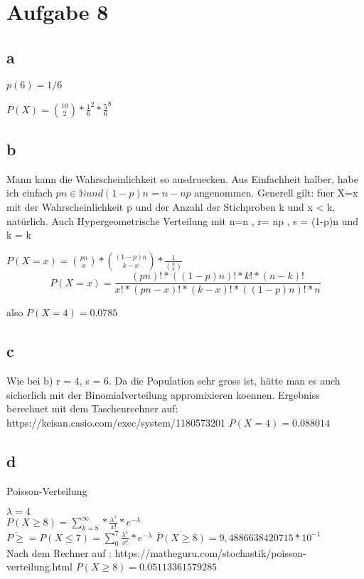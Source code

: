 \documentclass[]{article}
\title{}
\author{}
\begin{document}
\maketitle

\section{Aufgabe 8}
\subsection{a}
$ p(6) = 1/6$

$P(X) = \binom{10}2 * \frac{1}{6}^2 * \frac{5}{6}^8 $
\subsection{b}
Mann kann die Wahrscheinlichkeit so ausdruecken. Aus Einfachheit halber, habe ich einfach $ pn \in \mathbb{N} und (1-p)n = n-np $ angenommen.
Generell gilt: fuer X=x   mit der Wahrscheinlichkeit p und der Anzahl der Stichproben k und x < k, nat\"urlich.
Auch Hypergeometrische Verteilung mit n=n , r= np , s = (1-p)n und k = k

$P(X=x) = \binom{pn}{x} * \binom{(1-p)n}{k-x}  * \frac{1}{\binom{n}{k}} $
$$P(X=x) = \frac{(pn)!* ((1-p)n)! * k! * (n-k)!  }{x! * (pn -x)! * (k-x)! * ((1-p)n)! * n} $$


also 
$P(X = 4) = 0.0785 $
\subsection{c}
Wie bei b) r = 4, s = 6.
Da die Population sehr gross ist, h\"atte man es auch sicherlich mit der Binomialverteilung appromixieren koennen. 
Ergebniss berechnet mit dem Taschenrechner auf: https://keisan.casio.com/exec/system/1180573201
$ P (X = 4) = 0.088014 $

\subsection{d}

Poisson-Verteilung

$ \lambda = 4 $\\
$ P( X \geq 8 ) = \sum^{\infty}_{ k=8 } *\frac{\lambda^x}{x!}*e^{ -\lambda }  $\\
$ \overline{P \geq  }  = P( X \leq 7) =  \sum^7_0 \frac{\lambda^x}{x!}*e^{-\lambda}   $ 
$\overline{P}(X \geq 8)  =9,4886638420715*10^{-1}  $\\
Nach dem Rechner auf : 
https://matheguru.com/stochastik/poisson-verteilung.html
$ P(X \geq 8) = 0.05113361579285 $
\end{document}
